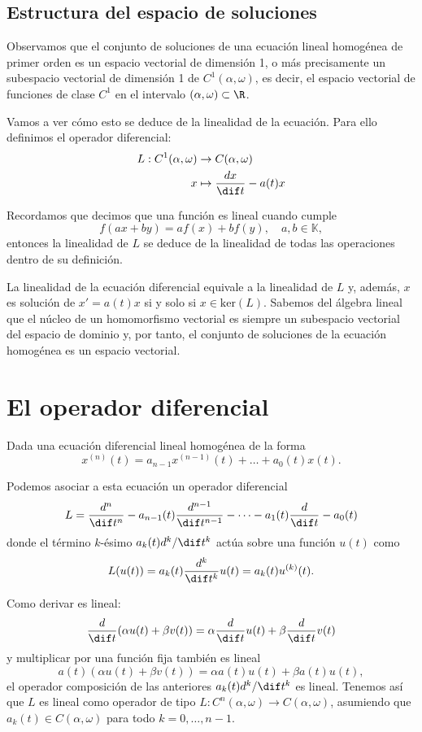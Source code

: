 \documentclass[../main.tex]{subfiles}
\begin{document}
\subsection{Estructura del espacio de soluciones}

Observamos que el conjunto de soluciones de una ecuación lineal homogénea de
primer orden es un espacio vectorial de dimensión 1, o más precisamente un
subespacio vectorial de dimensión 1 de \(C^1(\alpha, \omega)\), es decir, el
espacio vectorial de funciones de clase \(C^1\) en el intervalo
\((\alpha, \omega) \subset \R\).

Vamos a ver cómo esto se deduce de la linealidad de la ecuación. Para ello
definimos el operador diferencial:
\begin{align*}
  L : C^1(\alpha, \omega) &\to C(\alpha, \omega) \\
  x &\mapsto \frac{d x}{\dif t} - a(t)x
\end{align*}

Recordamos que decimos que una función es lineal cuando cumple
\[f(ax + by) = af(x) + bf(y), \quad a, b \in \mathbb{K},\]
entonces la linealidad de \(L\) se deduce de la linealidad de todas las
operaciones dentro de su definición.

\begin{remark}
La linealidad de la ecuación diferencial equivale a la linealidad de
\(L\) y, además, \(x\) es solución de \(x' = a(t)x\) si y solo si
\(x \in \text{ker}(L)\). Sabemos del álgebra lineal que el núcleo de un
homomorfismo vectorial es siempre un subespacio vectorial del espacio de dominio
y, por tanto, el conjunto de soluciones de la ecuación homogénea es un espacio
vectorial.
\end{remark}

\section{El operador diferencial}

Dada una ecuación diferencial lineal homogénea de la forma
\[x^{(n)}(t) = a_{n-1}x^{(n - 1)}(t) + \dots + a_0(t)x(t).\]

Podemos asociar a esta ecuación un operador diferencial
\[L = \frac{d^n}{\dif t^n} - a_{n-1}(t)\frac{d^{n-1}}{\dif t^{n-1}}
	- \dots - a_1(t)\frac{d}{\dif t} - a_0(t)\]
donde el término \(k\)-ésimo \(a_k(t) d^k/\dif t^k\) actúa sobre una
función \(u(t)\) como
\[L(u(t)) = a_k(t) \frac{d^k}{\dif t^k} u(t) = a_k(t) u^{(k)}(t).\]

Como derivar es lineal:
\[\frac{d}{\dif t} (\alpha u(t) + \beta v(t))
	= \alpha \frac{d}{\dif t} u(t) + \beta \frac{d}{\dif t} v(t)\]
y multiplicar por una función fija también es lineal
\[a(t)(\alpha u(t) + \beta v(t)) = \alpha a(t) u(t) + \beta a(t) u(t),\]
el operador composición de las anteriores \(a_k(t) d^k/\dif t^k\) es
lineal. Tenemos así que \(L\) es lineal como operador de tipo
\(L : C^n(\alpha, \omega) \to C(\alpha, \omega)\), asumiendo que
\(a_k(t) \in C(\alpha, \omega)\) para todo \(k=0, \dots, n-1\).
\end{document}
